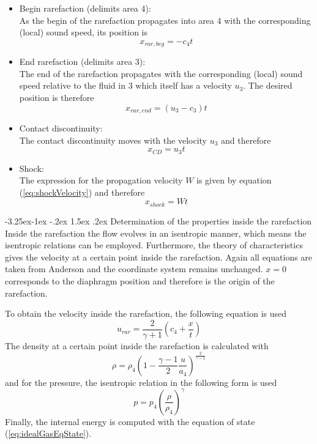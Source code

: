 \documentclass{report}
\makeatletter
\renewcommand\paragraph{\@startsection{paragraph}{4}{\z@}%
  {-3.25ex\@plus -1ex \@minus -.2ex}%
  {1.5ex \@plus .2ex}%
  {\normalfont\normalsize\bfseries}}
\makeatother
\begin{document}
\begin{itemize} 

  \item Begin rarefaction (delimits area 4): \\
As the begin of the rarefaction propagates into area 4 with the corresponding (local) sound speed, its position is 
\begin{equation}
 x_{rar,beg}=-c_4 t
\end{equation}

  \item End rarefaction (delimits area 3): \\
The end of the rarefaction propagates with the corresponding (local) sound speed relative to the fluid in 3 which itself has a velocity $u_3$. The desired position is therefore
\begin{equation}
 x_{rar,end}=(u_3-c_3) t
\end{equation}

  \item Contact discontinuity: \\
The contact discontinuity moves with the velocity $u_3$ and therefore
\begin{equation}
 x_{CD}=u_3 t
\end{equation}

  \item Shock: \\
  The expression for the propagation velocity $W$ is given by equation (\ref{eq:shockVelocity}) and therefore
\begin{equation}
 x_{shock}=W t
\end{equation}

\end{itemize}

\paragraph{Determination of the properties inside the rarefaction}
Inside the rarefaction the flow evolves in an isentropic manner, which means the isentropic relations can be employed. Furthermore, the theory of characteristics gives the velocity at a certain point inside the rarefaction. Again all equations are taken from Anderson \cite{Anderson2002} and the coordinate system remains unchanged. $x=0$ corresponds to the diaphragm position and therefore is the origin of the rarefaction.

To obtain the velocity inside the rarefaction, the following equation is used
\begin{equation}
 u_{rar}=\frac{2}{\gamma+1}\left(c_4+\frac{x}{t}\right)
\end{equation}
\noindent
The density at a certain point inside the rarefaction is calculated with
\begin{equation}
\rho=\rho_4 \left(1-\frac{\gamma-1}{2}\frac{u}{a_4}\right)^\frac{2}{\gamma-1}
\end{equation}
and for the pressure, the isentropic relation in the following form is used
\begin{equation}
p=p_4\left(\frac{\rho}{\rho_4}\right)^\gamma
\end{equation}
Finally, the internal energy is computed with the equation of state (\ref{eq:idealGasEqState}).
\end{document}
